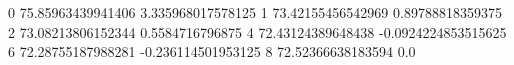 0 75.85963439941406 3.335968017578125
1 73.42155456542969 0.89788818359375
2 73.08213806152344 0.5584716796875
4 72.43124389648438 -0.0924224853515625
6 72.28755187988281 -0.236114501953125
8 72.52366638183594 0.0

